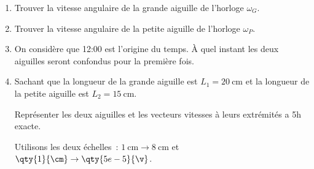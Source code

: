 \begin{enumerate}
    \item Trouver la vitesse angulaire de la grande aiguille de l’horloge
          $\omega_{G}$.
    \item Trouver la vitesse angulaire de la petite aiguille de l’horloge
          $\omega_{P}$.
    \item On considère que 12:00 est l'origine du temps. À quel instant les deux
          aiguilles seront confondus pour la première fois.
    \item Sachant que la longueur de la grande aiguille est
          $L_{1}=\qty{20}{\cm}$ et la longueur de la petite aiguille est
          $L_{2}=\qty{15}{\cm}$.
          
          Représenter les deux aiguilles et les vecteurs vitesses à leurs
          extrémités a 5h exacte.
          
          Utilisons les deux échelles~: $\qty{1}{\cm} \to \qty{8}{\cm}$
          et $\qty{1}{\cm} \to \qty{5e-5}{\v}$.
\end{enumerate}

